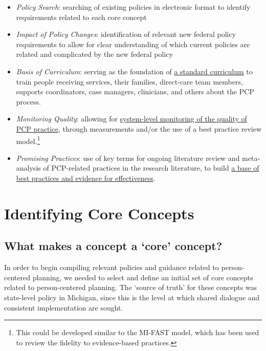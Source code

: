 \documentclass[
]{book}
\providecommand{\tightlist}{%
  \setlength{\itemsep}{0pt}\setlength{\parskip}{0pt}}
\begin{document}
\begin{itemize}
\tightlist
\item
  \emph{Policy Search}: searching of existing policies in electronic format to identify requirements related to each core concept
\item
  \emph{Impact of Policy Changes}: identification of relevant new federal policy requirements to allow for clear understanding of which current policies are related and complicated by the new federal policy
\item
  \emph{Basis of Curriculum}: serving as the foundation of \protect\hyperlink{curriculum}{a standard curriculum} to train people receiving services, their families, direct-care team members, supports coordinators, case managers, clinicians, and others about the PCP process.
\item
  \emph{Monitoring Quality}: allowing for \protect\hyperlink{measure}{system-level monitoring of the quality of PCP practice}, through measurements and/or the use of a best practice review model.\footnote{This could be developed similar to the MI-FAST model, which has been used to review the fidelity to evidence-based practices.}
\item
  \emph{Promising Practices}: use of key terms for ongoing literature review and meta-analysis of PCP-related practices in the research literature, to build \protect\hyperlink{research}{a base of best practices and evidence for effectiveness}.
\end{itemize}

\hypertarget{identifying-core-concepts}{%
\section{Identifying Core Concepts}\label{identifying-core-concepts}}

\hypertarget{what-makes-a-concept-a-core-concept}{%
\subsection{What makes a concept a `core' concept?}\label{what-makes-a-concept-a-core-concept}}

In order to begin compiling relevant policies and guidance related to person-centered planning, we needed to select and define an initial set of core concepts related to person-centered planning. The `source of truth' for these concepts was state-level policy in Michigan, since this is the level at which shared dialogue and consistent implementation are sought.
\end{document}
